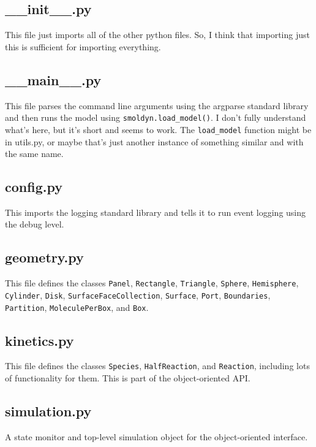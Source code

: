 \documentclass {book}
\newcommand {\ttt} {\texttt}
\begin{document}
\subsection*{\_\_init\_\_.py}

This file just imports all of the other python files. So, I think that importing just this is sufficient for importing everything.

\subsection*{\_\_main\_\_.py}

This file parses the command line arguments using the argparse standard library and then runs the model using \ttt{smoldyn.load\_model()}. I don't fully understand what's here, but it's short and seems to work. The \ttt{load\_model} function might be in utils.py, or maybe that's just another instance of something similar and with the same name.

\subsection*{config.py}

This imports the logging standard library and tells it to run event logging using the debug level.

\subsection*{geometry.py}

This file defines the classes \ttt{Panel}, \ttt{Rectangle}, \ttt{Triangle}, \ttt{Sphere}, \ttt{Hemisphere}, \ttt{Cylinder}, \ttt{Disk}, \ttt{SurfaceFaceCollection}, \ttt{Surface}, \ttt{Port}, \ttt{Boundaries}, \ttt{Partition}, \ttt{MoleculePerBox}, and \ttt{Box}.

\subsection*{kinetics.py}

This file defines the classes \ttt{Species}, \ttt{HalfReaction}, and \ttt{Reaction}, including lots of functionality for them. This is part of the object-oriented API.

\subsection*{simulation.py}

A state monitor and top-level simulation object for the object-oriented interface.
\end{document}
